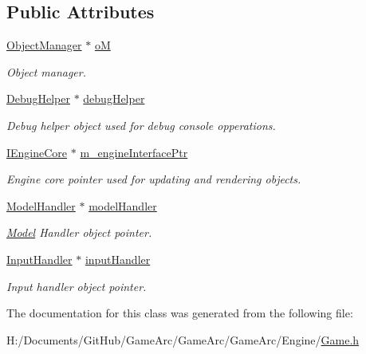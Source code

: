 \subsection*{Public Attributes}
\begin{DoxyCompactItemize}
\item 
\hypertarget{class_game_a713d1977c05e5003d15492eb036eacf4}{\hyperlink{class_object_manager}{Object\+Manager} $\ast$ \hyperlink{class_game_a713d1977c05e5003d15492eb036eacf4}{o\+M}}\label{class_game_a713d1977c05e5003d15492eb036eacf4}

\begin{DoxyCompactList}\small\item\em Object manager. \end{DoxyCompactList}\item 
\hypertarget{class_game_a4efa8c90dc6278091beaa1313c6a9bdc}{\hyperlink{class_debug_helper}{Debug\+Helper} $\ast$ \hyperlink{class_game_a4efa8c90dc6278091beaa1313c6a9bdc}{debug\+Helper}}\label{class_game_a4efa8c90dc6278091beaa1313c6a9bdc}

\begin{DoxyCompactList}\small\item\em Debug helper object used for debug console opperations. \end{DoxyCompactList}\item 
\hypertarget{class_game_ad01d32edc479a3edc79e5a3d7b4281d2}{\hyperlink{class_i_engine_core}{I\+Engine\+Core} $\ast$ \hyperlink{class_game_ad01d32edc479a3edc79e5a3d7b4281d2}{m\+\_\+engine\+Interface\+Ptr}}\label{class_game_ad01d32edc479a3edc79e5a3d7b4281d2}

\begin{DoxyCompactList}\small\item\em Engine core pointer used for updating and rendering objects. \end{DoxyCompactList}\item 
\hypertarget{class_game_a8580f3eefae3f52b256225a73a0c4791}{\hyperlink{class_model_handler}{Model\+Handler} $\ast$ \hyperlink{class_game_a8580f3eefae3f52b256225a73a0c4791}{model\+Handler}}\label{class_game_a8580f3eefae3f52b256225a73a0c4791}

\begin{DoxyCompactList}\small\item\em \hyperlink{class_model}{Model} Handler object pointer. \end{DoxyCompactList}\item 
\hypertarget{class_game_aa0ca10b15de880181ddcfede0de9226c}{\hyperlink{class_input_handler}{Input\+Handler} $\ast$ \hyperlink{class_game_aa0ca10b15de880181ddcfede0de9226c}{input\+Handler}}\label{class_game_aa0ca10b15de880181ddcfede0de9226c}

\begin{DoxyCompactList}\small\item\em Input handler object pointer. \end{DoxyCompactList}\end{DoxyCompactItemize}


The documentation for this class was generated from the following file\+:\begin{DoxyCompactItemize}
\item 
H\+:/\+Documents/\+Git\+Hub/\+Game\+Arc/\+Game\+Arc/\+Game\+Arc/\+Engine/\hyperlink{_game_8h}{Game.\+h}\end{DoxyCompactItemize}
